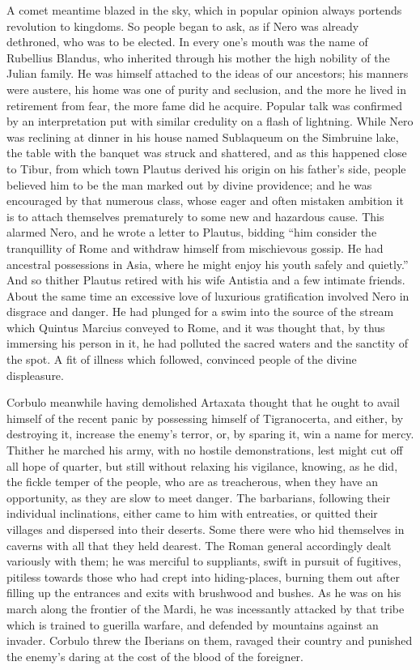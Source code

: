 A comet meantime blazed in the sky, which in popular opinion always portends revolution to kingdoms. So people began to ask, as if Nero was already dethroned, who was to be elected. In every one's mouth was the name of Rubellius Blandus, who inherited through his mother the high nobility of the Julian family. He was himself attached to the ideas of our ancestors; his manners were austere, his home was one of purity and seclusion, and the more he lived in retirement from fear, the more fame did he acquire. Popular talk was confirmed by an interpretation put with similar credulity on a flash of lightning. While Nero was reclining at dinner in his house named Sublaqueum on the Simbruine lake, the table with the banquet was struck and shattered, and as this happened close to Tibur, from which town Plautus derived his origin on his father's side, people believed him to be the man marked out by divine providence; and he was encouraged by that numerous class, whose eager and often mistaken ambition it is to attach themselves prematurely to some new and hazardous cause. This alarmed Nero, and he wrote a letter to Plautus, bidding ``him consider the tranquillity of Rome and withdraw himself from mischievous gossip. He had ancestral possessions in Asia, where he might enjoy his youth safely and quietly.'' And so thither Plautus retired with his wife Antistia and a few intimate friends. About the same time an excessive love of luxurious gratification involved Nero in disgrace and danger. He had plunged for a swim into the source of the stream which Quintus Marcius conveyed to Rome, and it was thought that, by thus immersing his person in it, he had polluted the sacred waters and the sanctity of the spot. A fit of illness which followed, convinced people of the divine displeasure.


Corbulo meanwhile having demolished Artaxata thought that he ought to avail himself of the recent panic by possessing himself of Tigranocerta, and either, by destroying it, increase the enemy's terror, or, by sparing it, win a name for mercy. Thither he marched his army, with no hostile demonstrations, lest might cut off all hope of quarter, but still without relaxing his vigilance, knowing, as he did, the fickle temper of the people, who are as treacherous, when they have an opportunity, as they are slow to meet danger. The barbarians, following their individual inclinations, either came to him with entreaties, or quitted their villages and dispersed into their deserts. Some there were who hid themselves in caverns with all that they held dearest. The Roman general accordingly dealt variously with them; he was merciful to suppliants, swift in pursuit of fugitives, pitiless towards those who had crept into hiding-places, burning them out after filling up the entrances and exits with brushwood and bushes. As he was on his march along the frontier of the Mardi, he was incessantly attacked by that tribe which is trained to guerilla warfare, and defended by mountains against an invader. Corbulo threw the Iberians on them, ravaged their country and punished the enemy's daring at the cost of the blood of the foreigner.

